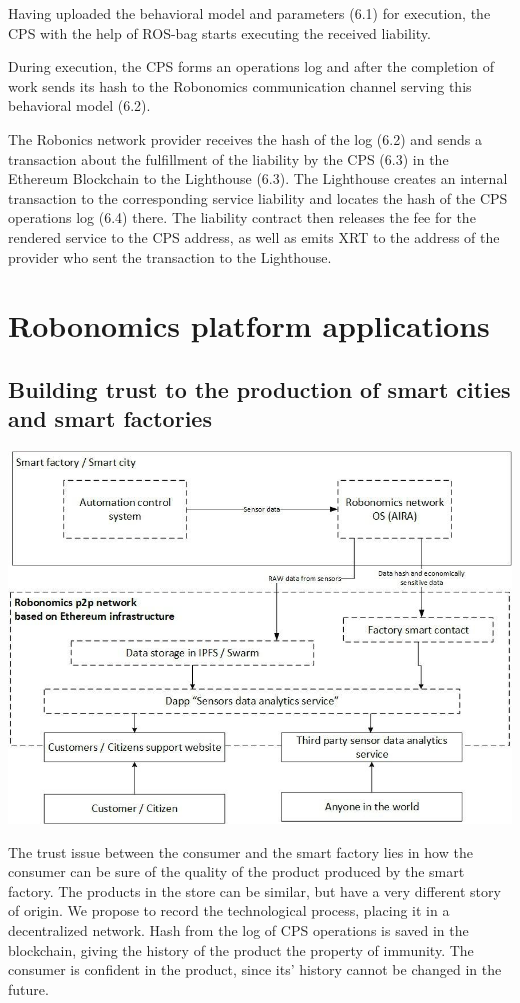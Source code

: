 \documentclass{article}
\begin{document}
Having uploaded the behavioral model and parameters (6.1) for execution, the CPS with the help of ROS-bag starts executing the received liability.

During execution, the CPS forms an operations log and after the completion of work sends its hash to the Robonomics communication channel serving this behavioral model (6.2).

The Robonics network provider receives the hash of the log (6.2) and sends a transaction about the fulfillment of the liability by the CPS (6.3) in the Ethereum Blockchain to the Lighthouse (6.3). The Lighthouse creates an internal transaction to the corresponding service liability and locates the hash of the CPS operations log (6.4) there. The liability contract then releases the fee for the rendered service to the CPS address, as well as emits XRT to the address of the provider who sent the transaction to the Lighthouse.

\section{Robonomics platform applications}

\subsection{Building trust to the production of smart cities and smart factories}

\includegraphics[width=1\textwidth]{app-1.png} 

The trust issue between the consumer and the smart factory lies in how the consumer can be sure of the quality of the product produced by the smart factory. The products in the store can be similar, but have a very different story of origin. We propose to record the technological process, placing it in a decentralized network. Hash from the log of CPS operations is saved in the blockchain, giving the history of the product the property of immunity. The consumer is confident in the product, since its' history cannot be changed in the future.
\end{document}
